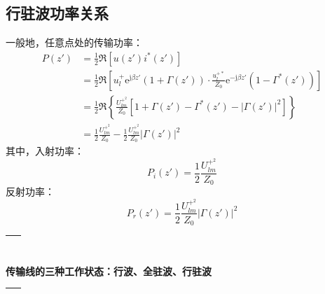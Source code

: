 \subsection{行驻波功率关系}

    一般地，任意点处的传输功率：
    \begin{align}
        P(z')&=\frac{1}{2}\Re\left[u(z')i^*(z')\right]\\
        &=\frac{1}{2}\Re\left[u^+_l \mathrm{e}^{\mathrm{j}\beta z'}(1+\varGamma(z'))\cdot\frac{u^{+*}_l}{Z_0}\mathrm{e}^{-\mathrm{j}\beta z'}(1-\varGamma^*(z'))\right]\\
        &=\frac{1}{2}\Re\left\{\frac{U^{+^2}_{lm}}{Z_0}\left[1+\varGamma(z')-\varGamma^*(z')-|\varGamma(z')|^2\right]\right\}\\
        &=\frac{1}{2}\frac{U^{+^2}_{lm}}{Z_0}-\frac{1}{2}\frac{U^{+^2}_{lm}}{Z_0}|\varGamma(z')|^2
    \end{align}
    其中，入射功率：
    \begin{equation}
        P_i(z')=\frac{1}{2}\frac{U^{+^2}_{lm}}{Z_0}
    \end{equation}
    反射功率：
    \begin{equation}
        P_r(z')=\frac{1}{2}\frac{U^{+^2}_{lm}}{Z_0}|\varGamma(z')|^2
    \end{equation}


    \begin{table}[ht]
        \setlength{\belowrulesep}{-5mm} %
        \setlength{\aboverulesep}{-5mm} %
        \centering
        \resizebox{\textwidth}{!}
        {
        \begin{tabular}{c}
            \toprule
            \hspace{15cm}~\\
            \hline
        \end{tabular}
        }
        \textbf{传输线的三种工作状态：行波、全驻波、行驻波}
        \resizebox{\textwidth}{!}
        {
        \begin{tabular}{c}
            \hline
            \hspace{15cm}~\\
            \bottomrule
        \end{tabular}
        }
    \end{table}

